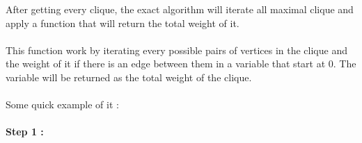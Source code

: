 \begin{center}
\end{center}

After getting every clique, the exact algorithm will iterate all maximal clique and apply a function that will return the total weight of it.
\\ \\
This function work by iterating every possible pairs of vertices in the clique and the weight of it if there is an edge between them in a variable that start at 0. The variable will be returned as the total weight of the clique.
\\ \\
Some quick example of it :
\\ \\
\hspace*{1cm}  \textbf{Step 1 :}

